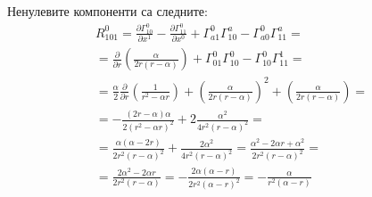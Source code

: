 \documentclass[a4paper,12pt]{article}
\begin{document}
    Ненулевите компоненти са следните: 
    \begin{equation*}
        \begin{aligned}
            R^0_{101} = \frac{\partial \varGamma^0_{10}}{\partial x^1} - \frac{\partial\varGamma^0_{11}}{\partial x^0}+ \varGamma^0_{a1}\varGamma^a_{10}
            - \varGamma^0_{a0}\varGamma^a_{11}= \\
            = \frac{\partial}{\partial r} \left( \frac{\alpha}{2r(r-\alpha)} \right)
            + \varGamma^0_{01}\varGamma^0_{10} - \varGamma^0_{10}\varGamma^1_{11} =\\
            = \frac{\alpha}{2}\frac{\partial}{\partial r}\left( \frac{1}{r^2-\alpha r} \right) + \left( \frac{\alpha}{2r(r-\alpha)} \right)^2 + \left( \frac{\alpha}{2r(r-\alpha)} \right)= \\
            = - \frac{(2r-\alpha)\alpha}{2(r^2-\alpha r)^2} + 2\frac{\alpha^2}{4r^2(r-\alpha)^2} = \\
            = \frac{\alpha(\alpha - 2r)}{2r^2(r-\alpha)^2} + \frac{2\alpha^2}{4r^2(r-\alpha)^2} = \frac{\alpha^2-2\alpha r + \alpha^2}{2r^2(r-\alpha)^2}= \\
            = \frac{2\alpha^2-2\alpha r}{2r^2(r-\alpha)} = -\frac{2\alpha(\alpha-r)}{2r^2(\alpha-r)^2} = - \frac{\alpha}{r^2(\alpha - r)}
        \end{aligned}
    \end{equation*}
\end{document}

